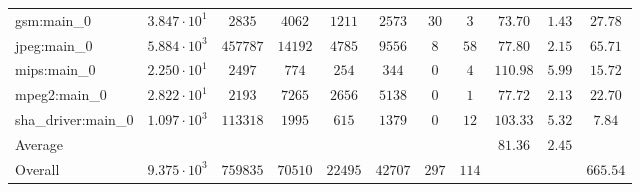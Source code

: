 \begin{tabular}{|l|c|c|c|c|c|c|c|c|c|c|}
gsm:main\_0             & $ 3.847 \cdot 10^{1} $ & $ 2835   $ & $ 4062  $ & $ 1211  $ & $ 2573  $ & $ 30  $ & $ 3   $ & $ 73.70       $ & $ 1.43    $ & $ 27.78   $ \\
jpeg:main\_0            & $ 5.884 \cdot 10^{3} $ & $ 457787 $ & $ 14192 $ & $ 4785  $ & $ 9556  $ & $ 8   $ & $ 58  $ & $ 77.80       $ & $ 2.15    $ & $ 65.71   $ \\
mips:main\_0            & $ 2.250 \cdot 10^{1} $ & $ 2497   $ & $ 774   $ & $ 254   $ & $ 344   $ & $ 0   $ & $ 4   $ & $ 110.98      $ & $ 5.99    $ & $ 15.72   $ \\
mpeg2:main\_0           & $ 2.822 \cdot 10^{1} $ & $ 2193   $ & $ 7265  $ & $ 2656  $ & $ 5138  $ & $ 0   $ & $ 1   $ & $ 77.72       $ & $ 2.13    $ & $ 22.70   $ \\
sha\_driver:main\_0     & $ 1.097 \cdot 10^{3} $ & $ 113318 $ & $ 1995  $ & $ 615   $ & $ 1379  $ & $ 0   $ & $ 12  $ & $ 103.33      $ & $ 5.32    $ & $ 7.84    $ \\
\hline
Average                 & $                    $ & $        $ & $       $ & $       $ & $       $ & $     $ & $     $ & $ 81.36       $ & $ 2.45    $ & $         $ \\
\hline
Overall                 & $ 9.375 \cdot 10^{3} $ & $ 759835 $ & $ 70510 $ & $ 22495 $ & $ 42707 $ & $ 297 $ & $ 114 $ & $             $ & $         $ & $ 665.54  $ \\
\hline
\end{tabular}
